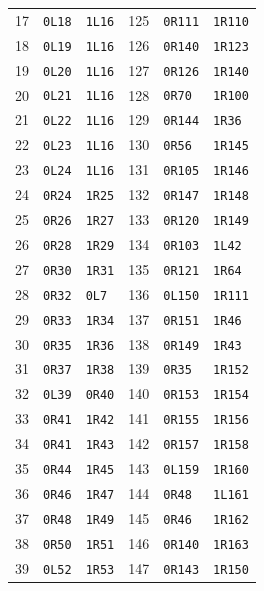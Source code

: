 \begin{longtable}{rll@{\hspace{18mm}}rll}
17 & \texttt{0L18} & \texttt{1L16} & 125 & \texttt{0R111} & \texttt{1R110} \\
18 & \texttt{0L19} & \texttt{1L16} & 126 & \texttt{0R140} & \texttt{1R123} \\
19 & \texttt{0L20} & \texttt{1L16} & 127 & \texttt{0R126} & \texttt{1R140} \\
20 & \texttt{0L21} & \texttt{1L16} & 128 & \texttt{0R70} & \texttt{1R100} \\
21 & \texttt{0L22} & \texttt{1L16} & 129 & \texttt{0R144} & \texttt{1R36} \\
22 & \texttt{0L23} & \texttt{1L16} & 130 & \texttt{0R56} & \texttt{1R145} \\
23 & \texttt{0L24} & \texttt{1L16} & 131 & \texttt{0R105} & \texttt{1R146} \\
24 & \texttt{0R24} & \texttt{1R25} & 132 & \texttt{0R147} & \texttt{1R148} \\
25 & \texttt{0R26} & \texttt{1R27} & 133 & \texttt{0R120} & \texttt{1R149} \\
26 & \texttt{0R28} & \texttt{1R29} & 134 & \texttt{0R103} & \texttt{1L42} \\
27 & \texttt{0R30} & \texttt{1R31} & 135 & \texttt{0R121} & \texttt{1R64} \\
28 & \texttt{0R32} & \texttt{0L7} & 136 & \texttt{0L150} & \texttt{1R111} \\
29 & \texttt{0R33} & \texttt{1R34} & 137 & \texttt{0R151} & \texttt{1R46} \\
30 & \texttt{0R35} & \texttt{1R36} & 138 & \texttt{0R149} & \texttt{1R43} \\
31 & \texttt{0R37} & \texttt{1R38} & 139 & \texttt{0R35} & \texttt{1R152} \\
32 & \texttt{0L39} & \texttt{0R40} & 140 & \texttt{0R153} & \texttt{1R154} \\
33 & \texttt{0R41} & \texttt{1R42} & 141 & \texttt{0R155} & \texttt{1R156} \\
34 & \texttt{0R41} & \texttt{1R43} & 142 & \texttt{0R157} & \texttt{1R158} \\
35 & \texttt{0R44} & \texttt{1R45} & 143 & \texttt{0L159} & \texttt{1R160} \\
36 & \texttt{0R46} & \texttt{1R47} & 144 & \texttt{0R48} & \texttt{1L161} \\
37 & \texttt{0R48} & \texttt{1R49} & 145 & \texttt{0R46} & \texttt{1R162} \\
38 & \texttt{0R50} & \texttt{1R51} & 146 & \texttt{0R140} & \texttt{1R163} \\
39 & \texttt{0L52} & \texttt{1R53} & 147 & \texttt{0R143} & \texttt{1R150} \\

\end{longtable}
